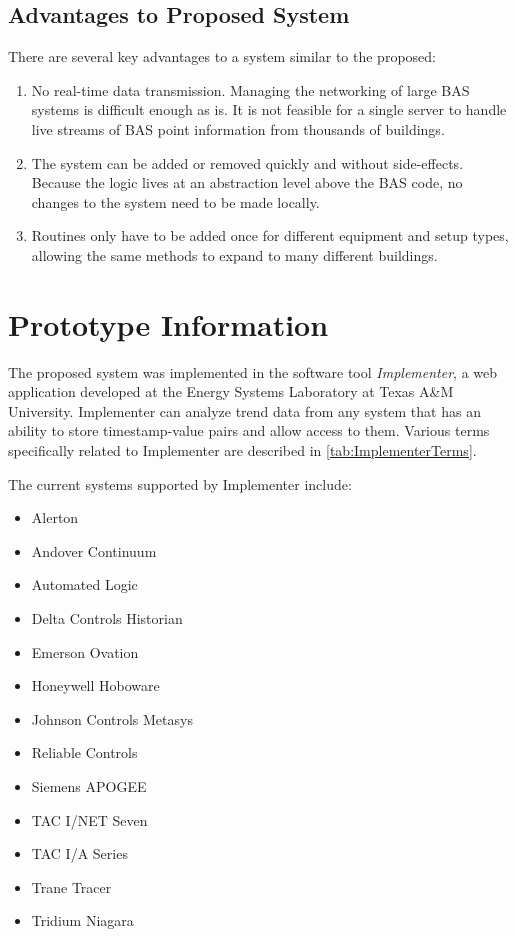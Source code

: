 \subsection{Advantages to Proposed System}

There are several key advantages to a system similar to the proposed:

\begin{enumerate}
    \item No real-time data transmission. Managing the networking of
        large BAS systems is difficult enough as is. It is not feasible
        for a single server to handle live streams of BAS point
        information from thousands of buildings. 

    \item The system can be added or removed quickly and without
        side-effects. Because the logic lives at an abstraction level
        above the BAS code, no changes to the system need to be made
        locally. 

    \item Routines only have to be added once for different equipment
        and setup types, allowing the same methods to expand to many
        different buildings. 
\end{enumerate}


\section{Prototype Information}

The proposed system was implemented in the software tool
\textit{Implementer}, a web application developed at the Energy Systems
Laboratory at Texas A\&M University. Implementer can analyze trend data
from any system that has an ability to store timestamp-value pairs and
allow access to them.  Various terms specifically related to Implementer are described in
\tableref{} \ref{tab:ImplementerTerms}.  

The current systems supported by Implementer include:

\begin{itemize}
    \item Alerton
    \item Andover Continuum
    \item Automated Logic
    \item Delta Controls Historian
    \item Emerson Ovation
    \item Honeywell Hoboware
    \item Johnson Controls Metasys
    \item Reliable Controls
    \item Siemens APOGEE
    \item TAC I/NET Seven
    \item TAC I/A Series
    \item Trane Tracer
    \item Tridium Niagara 
\end{itemize}

